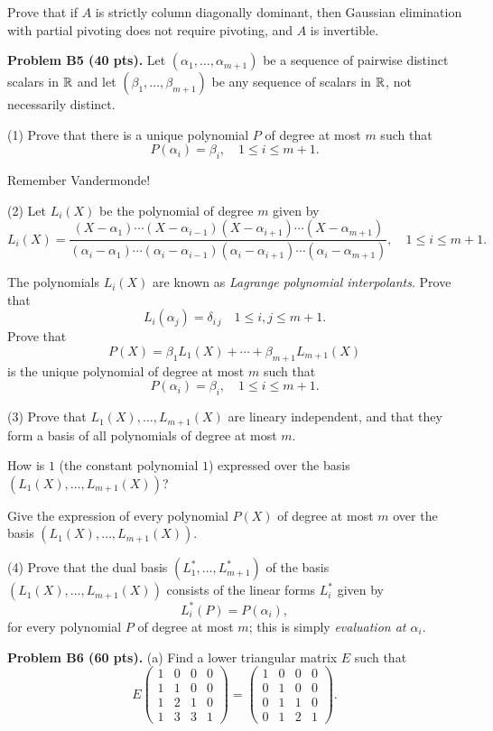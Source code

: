 \documentclass[12pt]{article}
\begin{document}
Prove that if $A$ is  strictly column diagonally dominant, then
Gaussian elimination with partial pivoting does not require pivoting, and 
$A$ is invertible.



\vspace {0.25cm}\noindent
{\bf Problem B5 (40 pts).}
Let $(\alpha_1, \ldots, \alpha_{m + 1})$ be a sequence of pairwise distinct
scalars in ${\mathbb R}$ and let $(\beta_1, \ldots, \beta_{m + 1})$ be any 
sequence of scalars in ${\mathbb R}$, not necessarily distinct.

\medskip
(1)
Prove that there is a unique polynomial $P$ of degree at most $m$
such that
\[
P(\alpha_i) = \beta_i, \quad 1\leq i \leq m + 1. 
\]

\medskip
\hint
Remember Vandermonde!

\medskip
(2)
Let $L_i(X)$ be the polynomial of degree $m$ given by
\[
L_i(X) = \frac{(X - \alpha_1)\cdots (X - \alpha_{i - 1}) (X - \alpha_{i + 1})
\cdots (X - \alpha_{m + 1})}
  {(\alpha_i - \alpha_1)\cdots (\alpha_i - \alpha_{i - 1}) 
(\alpha_i - \alpha_{i + 1}) \cdots (\alpha_i - \alpha_{m + 1})},
\quad 1 \leq i \leq m + 1.
\]

The polynomials $L_i(X)$ are known as 
{\it Lagrange polynomial interpolants\/}.
Prove that
\[
L_i(\alpha_j) = \delta_{i\, j} \quad 1\leq i, j \leq m + 1.
\]
Prove that
\[
P(X) = \beta_1L_1(X) + \cdots + \beta_{m + 1} L_{m + 1}(X)
\]
is the unique polynomial of degree at most $m$ such that
\[
P(\alpha_i) = \beta_i, \quad 1\leq i \leq m + 1. 
\]

\medskip
(3)
Prove that $L_1(X), \dots, L_{m + 1}(X)$ are lineary independent, and that
they form a basis of all polynomials of degree at most $m$.

\medskip
How is $1$ (the constant polynomial $1$)
expressed over the basis $(L_1(X), \dots, L_{m + 1}(X))$?

\medskip
Give the expression of every polynomial $P(X)$ of degree at most $m$ over
the basis $(L_1(X), \dots, L_{m + 1}(X))$.

\medskip
(4)
Prove that the dual basis $(L_1^*, \dots, L_{m + 1}^*)$
of the basis $(L_1(X), \dots, L_{m + 1}(X))$ consists of the linear forms
$L_i^*$ given by
\[
L_i^*(P) = P(\alpha_i),
\]
for every polynomial $P$ of degree at most $m$;
this is simply {\it evaluation at $\alpha_i$\/}.

\vspace {0.25cm}\noindent
{\bf Problem B6 (60 pts).}
(a)
Find a lower triangular matrix $E$ such that
\[
E 
\begin{pmatrix}
1 & 0 & 0 & 0 \\
1 & 1 & 0 & 0 \\
1 & 2 & 1 & 0 \\
1 & 3 & 3 & 1
\end{pmatrix}
=
\begin{pmatrix}
1 & 0 & 0 & 0 \\
0 & 1 & 0 & 0 \\
0 & 1 & 1 & 0 \\
0 & 1 & 2 & 1 
\end{pmatrix}.
\]
\end{document}
